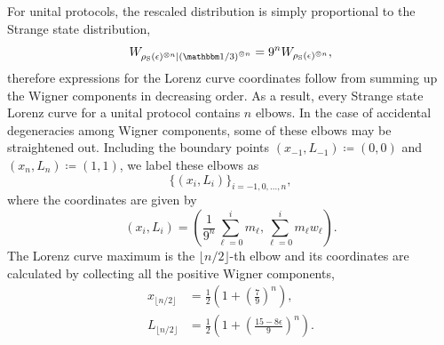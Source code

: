 \documentclass[pra,
aps,
twocolumn,
superscriptaddress,
groupedaddress,
nofootinbib,
reprint
]{revtex4-1}
\begin{document}
For unital protocols, the rescaled distribution is simply proportional to the Strange state distribution,
\begin{equation}
	W_{\rho_{\rm{S}}(\epsilon)^{\otimes n}|\left(\id/3\right)^{\otimes n}} = 9^n W_{\rho_{\rm{S}}(\epsilon)^{\otimes n}},
\end{equation}
therefore expressions for the Lorenz curve coordinates follow from summing up the Wigner components in decreasing order.
As a result, every Strange state Lorenz curve for a unital protocol contains $n$ elbows. In the case of accidental degeneracies among Wigner components, some of these elbows may be straightened out.
Including the boundary points $(x_{-1}, L_{-1}) \coloneqq (0,0)$ and $(x_{n}, L_{n}) \coloneqq (1,1)$, we label these elbows as 
\begin{equation*}
\{(x_{i}, L_{i})\}_{i=-1,0,\dots,n},
\end{equation*}
where the coordinates are given by
\begin{equation}
	(x_{i}, L_{i}) = \left( \frac{1}{9^n}\sum_{\ell=0}^i m_{\ell}, \sum_{\ell=0}^i m_{\ell} w_{\ell} \right).
\end{equation}
The Lorenz curve maximum is the $\lfloor n/2 \rfloor$-th elbow and its coordinates are calculated by collecting all the positive Wigner components,
\begin{align}
	x_{\lfloor n/2 \rfloor} &= \frac{1}{2}\left(1 + \left(\frac{7}{9}\right)^n\right), \\
	L_{\lfloor n/2 \rfloor} &= \frac{1}{2}\left (1 + \left(\frac{15 - 8\epsilon}{9}\right)^n \right).
\end{align}
\end{document}
